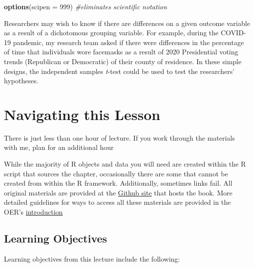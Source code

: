 \documentclass[
  11pt,
]{book}
\newenvironment{Shaded}{\begin{snugshade}}{\end{snugshade}}
\newcommand{\AttributeTok}[1]{\textcolor[rgb]{0.27,0.27,0.27}{#1}}
\newcommand{\CommentTok}[1]{\textcolor[rgb]{0.37,0.37,0.37}{\textit{#1}}}
\newcommand{\DecValTok}[1]{\textcolor[rgb]{0.06,0.06,0.06}{#1}}
\newcommand{\FunctionTok}[1]{\textcolor[rgb]{0.27,0.27,0.27}{\textbf{#1}}}
\newcommand{\NormalTok}[1]{#1}
\begin{document}
\begin{Shaded}
\begin{Highlighting}[]
\FunctionTok{options}\NormalTok{(}\AttributeTok{scipen =} \DecValTok{999}\NormalTok{)  }\CommentTok{\#eliminates scientific notation}
\end{Highlighting}
\end{Shaded}

Researchers may wish to know if there are differences on a given outcome variable as a result of a dichotomous grouping variable. For example, during the COVID-19 pandemic, my research team asked if there were differences in the percentage of time that individuals wore facemasks as a result of 2020 Presidential voting trends (Republican or Democratic) of their county of residence. In these simple designs, the independent samples \emph{t}-test could be used to test the researchers' hypotheses.

\hypertarget{navigating-this-lesson-3}{%
\section{Navigating this Lesson}\label{navigating-this-lesson-3}}

There is just less than one hour of lecture. If you work through the materials with me, plan for an additional hour

While the majority of R objects and data you will need are created within the R script that sources the chapter, occasionally there are some that cannot be created from within the R framework. Additionally, sometimes links fail. All original materials are provided at the \href{https://github.com/lhbikos/ReCenterPsychStats}{Github site} that hosts the book. More detailed guidelines for ways to access all these materials are provided in the OER's \protect\hyperlink{ReCintro}{introduction}

\hypertarget{learning-objectives-3}{%
\subsection{Learning Objectives}\label{learning-objectives-3}}

Learning objectives from this lecture include the following:
\end{document}
